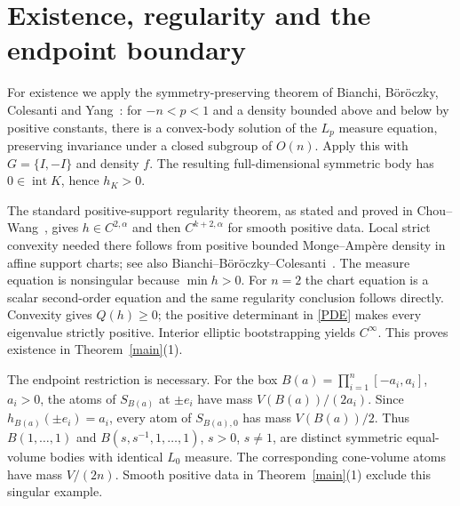 \documentclass[11pt]{article}
\newcommand{\Q}{Q}
\begin{document}
\section{Existence, regularity and the endpoint boundary}

For existence we apply the symmetry-preserving theorem of Bianchi, B\"or\"oczky, Colesanti and Yang~\cite[Theorem 1.7 and Proposition 7.3]{BBCY}: for $-n<p<1$ and a density bounded above and below by positive constants, there is a convex-body solution of the $L_p$ measure equation, preserving invariance under a closed subgroup of $O(n)$. Apply this with $G=\{I,-I\}$ and density $f$. The resulting full-dimensional symmetric body has $0\in\operatorname{int}K$, hence $h_K>0$.

The standard positive-support regularity theorem, as stated and proved in Chou--Wang~\cite[Proposition 1.2 and Section 6]{CW}, gives $h\in C^{2,\alpha}$ and then $C^{k+2,\alpha}$ for smooth positive data. Local strict convexity needed there follows from positive bounded Monge--Amp\`ere density in affine support charts; see also Bianchi--B\"or\"oczky--Colesanti~\cite[Theorem 1.1(i),(iv)]{BBC}. The measure equation is nonsingular because $\min h>0$. For $n=2$ the chart equation is a scalar second-order equation and the same regularity conclusion follows directly. Convexity gives $\Q(h)\ge0$; the positive determinant in \eqref{PDE} makes every eigenvalue strictly positive. Interior elliptic bootstrapping yields $C^\infty$. This proves existence in Theorem~\ref{main}(1).

The endpoint restriction is necessary. For the box $B(a)=\prod_{i=1}^n[-a_i,a_i]$, $a_i>0$, the atoms of $S_{B(a)}$ at $\pm e_i$ have mass $V(B(a))/(2a_i)$. Since $h_{B(a)}(\pm e_i)=a_i$, every atom of $S_{B(a),0}$ has mass $V(B(a))/2$. Thus $B(1,\ldots,1)$ and $B(s,s^{-1},1,\ldots,1)$, $s>0$, $s\ne1$, are distinct symmetric equal-volume bodies with identical $L_0$ measure. The corresponding cone-volume atoms have mass $V/(2n)$. Smooth positive data in Theorem~\ref{main}(1) exclude this singular example.
\end{document}
